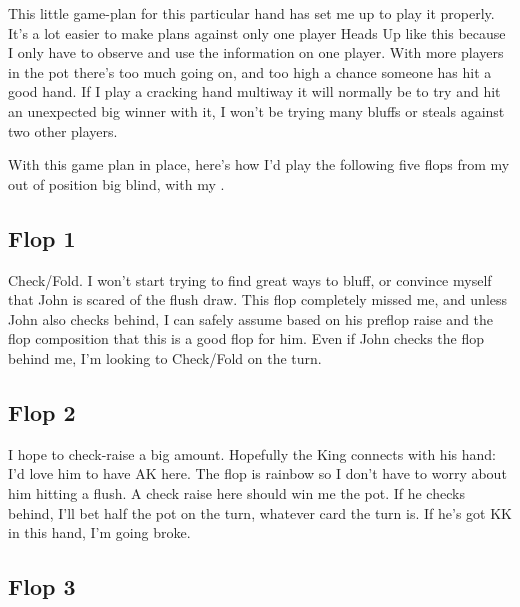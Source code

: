 This little game-plan for this particular hand has set me
up to play it properly. It's a lot easier to make plans
against only one player Heads Up like this because I only have
to observe and use the information on one player. With more players
in the pot there's too much going on, and too high a chance someone
has hit a good hand. If I play a cracking hand multiway it will
normally be to try and hit an unexpected big winner with it, I won't
be trying many bluffs or steals against two other players.

With this game plan in place, here's how I'd play the following
five flops from my out of position big blind, with my \eigc\sixc.

\subsection*{Flop 1}

\begin{cards}
\crdAh\crdKc\crdtenh%
\end{cards}

Check/Fold. I won't start trying to find great ways to bluff,
or convince myself that John is scared of the flush
draw. This flop completely missed me, and unless John also
checks behind, I can safely assume based on his preflop raise
and the flop composition that this is a good flop for him.
Even if John checks the flop behind me, I'm looking
to Check/Fold on the turn.

\newpage

\subsection*{Flop 2}

\begin{cards}
\crdKs\crdeigh\crdsixd%
\end{cards}

I hope to check-raise a big amount. Hopefully the King connects
with his hand: I'd love him to have AK here. The flop is rainbow
so I don't have to worry about him hitting a flush. A check raise
here should win me the pot. If he checks behind, I'll bet half
the pot on the turn, whatever card the turn is. If he's got KK
in this hand, I'm going broke.

\subsection*{Flop 3}

